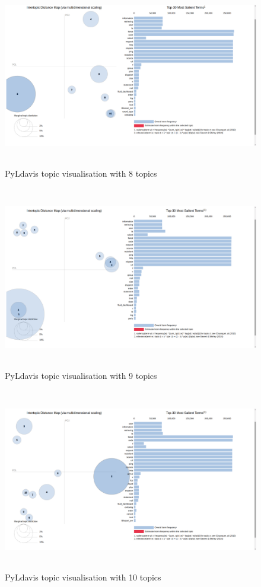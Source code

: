  \begin{figure}[h]
    \centering
    \includegraphics[width=15cm, height=8cm,trim=0 0 100px 0, clip=true]{figures/pyldavis/pyldavis_8.png}
    \caption{PyLdavis topic visualisation with 8 topics}
    \label{fig:pyldavis_8}
\end{figure}

 \begin{figure}[!h]
    \centering
    \includegraphics[width=15cm, height=8cm,trim=0 0 100px 0, clip=true]{figures/pyldavis/pyldavis_9.png}
    \caption{PyLdavis topic visualisation with 9 topics}
    \label{fig:pyldavis_9}
\end{figure}

 \begin{figure}[!h]
    \centering
    \includegraphics[width=15cm, height=8cm,trim=0 0 100px 0, clip=true]{figures/pyldavis/pyldavis_10.png}
    \caption{PyLdavis topic visualisation with 10 topics}
    \label{fig:appendices:pyldavis_10}
\end{figure}

